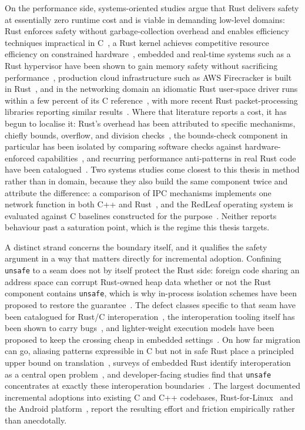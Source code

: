 \documentclass[english,twoside,openright,a4paper,censored,csm,software-track-2020]{HYthesisML}
\begin{document}
On the performance side, systems-oriented studies argue that Rust delivers safety at
essentially zero runtime cost and is viable in demanding low-level domains: Rust enforces
safety without garbage-collection overhead and enables efficiency techniques impractical in
C~\cite{balasubramanian2017rust}, a Rust kernel achieves competitive resource efficiency on
constrained hardware~\cite{levy2017kernel}, embedded and real-time systems such as a Rust
hypervisor have been shown to gain memory safety without sacrificing
performance~\cite{mo2023rustshyper}, production cloud infrastructure such as AWS Firecracker is
built in Rust~\cite{agache2020firecracker}, and in the networking domain an idiomatic Rust
user-space driver runs within a few percent of its C reference~\cite{emmerich2019drivers},
with more recent Rust packet-processing libraries reporting similar
results~\cite{xiao2024rpkt}. Where that literature reports a cost, it has begun to localise
it: Rust's overhead has been attributed to specific mechanisms, chiefly bounds, overflow, and
division checks~\cite{zhang2022runtime}, the bounds-check component in particular has been
isolated by comparing software checks against hardware-enforced
capabilities~\cite{harris2023morello}, and recurring performance anti-patterns in real Rust
code have been catalogued~\cite{cui2025perfbugs}. Two systems studies come closest to this
thesis in method rather than in domain, because they also build the same component twice and
attribute the difference: a comparison of IPC mechanisms implements one network function in
both C++ and Rust~\cite{li2021ipc}, and the RedLeaf operating system is evaluated against C
baselines constructed for the purpose~\cite{narayanan2020redleaf}. Neither reports behaviour
past a saturation point, which is the regime this thesis targets.

A distinct strand concerns the boundary itself, and it qualifies the safety argument in a way
that matters directly for incremental adoption. Confining \texttt{unsafe} to a seam does not by
itself protect the Rust side: foreign code sharing an address space can corrupt Rust-owned heap
data whether or not the Rust component contains \texttt{unsafe}, which is why in-process
isolation schemes have been proposed to restore the
guarantee~\cite{rivera2021galeed,kirth2022pkrusafe}. The defect classes specific to that seam
have been catalogued for Rust/C interoperation~\cite{li2022crosslang}, the interoperation
tooling itself has been shown to carry bugs~\cite{cai2026interop}, and lighter-weight execution
models have been proposed to keep the crossing cheap in embedded
settings~\cite{schuermann2023encapsulated}. On how far migration can go, aliasing patterns
expressible in C but not in safe Rust place a principled upper bound on
translation~\cite{emre2023aliasing}, surveys of embedded Rust identify interoperation as a
central open problem~\cite{sharma2024embedded}, and developer-facing studies find that
\texttt{unsafe} concentrates at exactly these interoperation
boundaries~\cite{mccormack2026unsafe}. The largest documented incremental adoptions into
existing C and C++ codebases, Rust-for-Linux~\cite{li2024rustforlinux} and the Android
platform~\cite{fan2026android}, report the resulting effort and friction empirically rather
than anecdotally.
\end{document}
